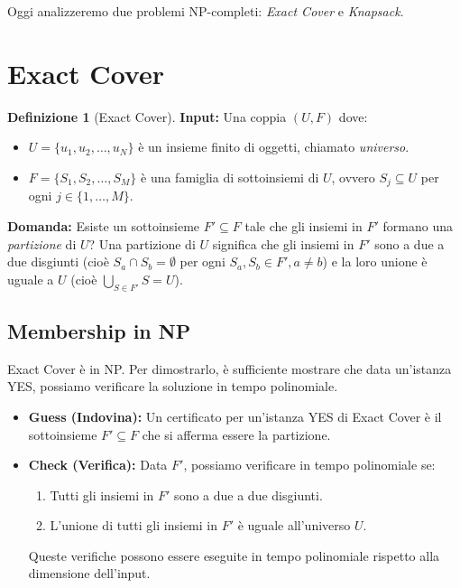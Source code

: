 \documentclass[a4paper]{article}
\theoremstyle{definition} %
\newtheorem{definition}{Definizione}
\begin{document}
Oggi analizzeremo due problemi NP-completi: \emph{Exact Cover} e \emph{Knapsack}.

\section{Exact Cover}

\begin{definition}[Exact Cover]
\textbf{Input:}
Una coppia $(U, F)$ dove:
\begin{itemize}
    \item $U = \{u_1, u_2, \ldots, u_N\}$ è un insieme finito di oggetti, chiamato \emph{universo}.
    \item $F = \{S_1, S_2, \ldots, S_M\}$ è una famiglia di sottoinsiemi di $U$, ovvero $S_j \subseteq U$ per ogni $j \in \{1, \ldots, M\}$.
\end{itemize}
\textbf{Domanda:} Esiste un sottoinsieme $F' \subseteq F$ tale che gli insiemi in $F'$ formano una \emph{partizione} di $U$?
Una partizione di $U$ significa che gli insiemi in $F'$ sono a due a due disgiunti (cioè $S_a \cap S_b = \emptyset$ per ogni $S_a, S_b \in F', a \neq b$) e la loro unione è uguale a $U$ (cioè $\bigcup_{S \in F'} S = U$).
\end{definition}

\subsection{Membership in NP}
Exact Cover è in NP. Per dimostrarlo, è sufficiente mostrare che data un'istanza YES, possiamo verificare la soluzione in tempo polinomiale.
\begin{itemize}
    \item \textbf{Guess (Indovina):} Un certificato per un'istanza YES di Exact Cover è il sottoinsieme $F' \subseteq F$ che si afferma essere la partizione.
    \item \textbf{Check (Verifica):} Data $F'$, possiamo verificare in tempo polinomiale se:
        \begin{enumerate}
            \item Tutti gli insiemi in $F'$ sono a due a due disgiunti.
            \item L'unione di tutti gli insiemi in $F'$ è uguale all'universo $U$.
        \end{enumerate}
    Queste verifiche possono essere eseguite in tempo polinomiale rispetto alla dimensione dell'input.
\end{itemize}
\end{document}
